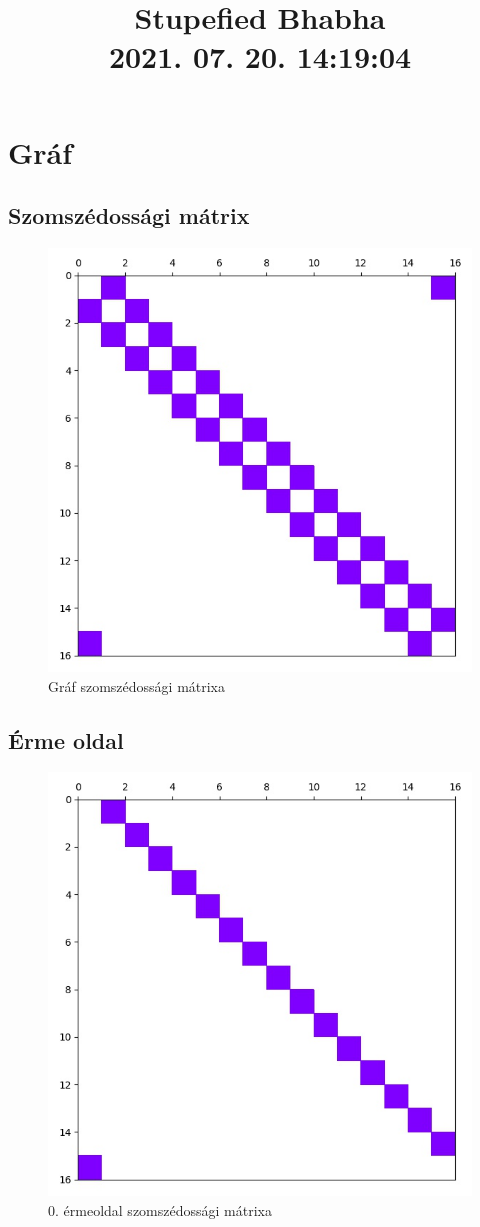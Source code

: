 \documentclass[14pt,a4paper]{article}
\title{Stupefied Bhabha \\ \large 2021. 07. 20. 14:19:04}
\author{}
\date{}
\begin{document}
\maketitle
\section{Gráf}
\subsection{Szomszédossági mátrix}
\begin{figure}[H]
\centering
\includegraphics[width = 0.7\columnwidth]{graph/graph.jpg}
\caption{Gráf szomszédossági mátrixa}
\end{figure}
\subsection{Érme oldal}
\begin{figure}[H]
\centering
\includegraphics[width = 0.7\columnwidth]{coin_faces/coin_face_00.jpg}
\caption{0. érmeoldal szomszédossági mátrixa}
\end{figure}
\end{document}
